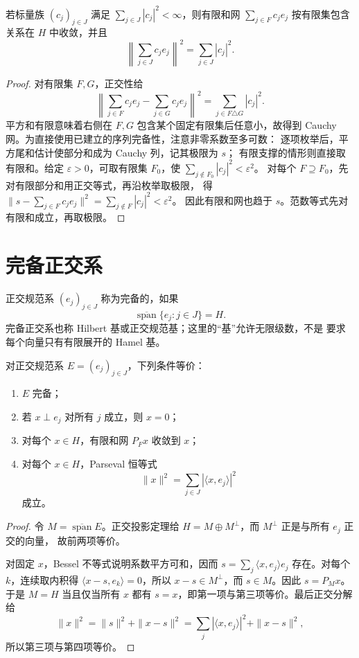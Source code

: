 \begin{corollary}\label{cor:orthogonal-series-convergence}
若标量族 \((c_j)_{j\in J}\) 满足
\(\sum_{j\in J}|c_j|^2<\infty\)，则有限和网
\(\sum_{j\in F}c_je_j\) 按有限集包含关系在 \(H\) 中收敛，并且
\[
 \left\|\sum_{j\in J}c_je_j\right\|^2=\sum_{j\in J}|c_j|^2.
\]
\end{corollary}
\begin{proof}
对有限集 \(F,G\)，正交性给
\[
 \left\|\sum_{j\in F}c_je_j-\sum_{j\in G}c_je_j\right\|^2
 =\sum_{j\in F\triangle G}|c_j|^2.
\]
平方和有限意味着右侧在 \(F,G\) 包含某个固定有限集后任意小，故得到
Cauchy 网。为直接使用已建立的序列完备性，注意非零系数至多可数：
逐项枚举后，平方尾和估计使部分和成为 Cauchy 列，记其极限为 \(s\)；
有限支撑的情形则直接取有限和。给定 \(\varepsilon>0\)，可取有限集
\(F_0\)，使 \(\sum_{j\notin F_0}|c_j|^2<\varepsilon^2\)。
对每个 \(F\supseteq F_0\)，先对有限部分和用正交等式，再沿枚举取极限，
得
\(\|s-\sum_{j\in F}c_je_j\|^2=\sum_{j\notin F}|c_j|^2<\varepsilon^2\)。
因此有限和网也趋于 \(s\)。范数等式先对有限和成立，再取极限。
\end{proof}

\section{完备正交系}

\begin{definition}
正交规范系 \((e_j)_{j\in J}\) 称为完备的，如果
\[
 \overline{\operatorname{span}}\{e_j:j\in J\}=H.
\]
完备正交系也称 Hilbert 基或正交规范基；这里的“基”允许无限级数，不是
要求每个向量只有有限展开的 Hamel 基。
\end{definition}

\begin{theorem}\label{thm:orthonormal-completeness-equivalences}
对正交规范系 \(E=(e_j)_{j\in J}\)，下列条件等价：
\begin{enumerate}
 \item \(E\) 完备；
 \item 若 \(x\perp e_j\) 对所有 \(j\) 成立，则 \(x=0\)；
 \item 对每个 \(x\in H\)，有限和网 \(P_Fx\) 收敛到 \(x\)；
 \item 对每个 \(x\in H\)，Parseval 恒等式
 \[
   \|x\|^2=\sum_{j\in J}|\langle x,e_j\rangle|^2
 \]
 成立。
\end{enumerate}
\end{theorem}
\begin{proof}
令 \(M=\overline{\operatorname{span}}E\)。正交投影定理给
\(H=M\oplus M^\perp\)，而 \(M^\perp\) 正是与所有 \(e_j\) 正交的向量，
故前两项等价。

对固定 \(x\)，Bessel 不等式说明系数平方可和，因而
\(s=\sum_j\langle x,e_j\rangle e_j\) 存在。对每个 \(k\)，连续取内积得
\(\langle x-s,e_k\rangle=0\)，所以 \(x-s\in M^\perp\)，而
\(s\in M\)。因此 \(s=P_Mx\)。于是 \(M=H\) 当且仅当所有 \(x\) 都有
\(s=x\)，即第一项与第三项等价。最后正交分解给
\[
 \|x\|^2=\|s\|^2+\|x-s\|^2
 =\sum_j|\langle x,e_j\rangle|^2+\|x-s\|^2,
\]
所以第三项与第四项等价。
\end{proof}

